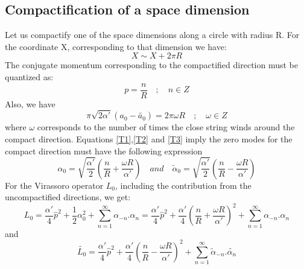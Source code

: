 \subsection{Compactification of a space dimension}
Let us compactify one of the space dimensions along a circle with radius R. For the coordinate X, corresponding to that dimension we have: 
\begin{equation}
	X\sim X + 2\pi R
\end{equation}
The conjugate momentum corresponding to the compactified direction must be quantized as:
\begin{equation}
	p = \frac{n}{R}\quad;\quad n \in Z
	\label{T2}
\end{equation}
Also, we have
\begin{equation}
	\pi\sqrt{2\alpha'}\left(a_0-\tilde{a_0}\right) = 2\pi\omega R\quad;\quad \omega\in Z
	\label{T3}
\end{equation}
 where $\omega$ corresponds to the number of times the close string winds around the compact direction. 
Equations \eqref{T1},\eqref{T2} and \eqref{T3} imply the zero modes for the compact direction must have the following expression
\begin{equation}
	\alpha_0 = \sqrt{\frac{\alpha'}{2}}\left(\frac{n}{R}+\frac{\omega R}{\alpha'}\right)\quad and\quad \tilde{\alpha}_0 = \sqrt{\frac{\alpha'}{2}}\left(\frac{n}{R}-\frac{\omega R}{\alpha'}\right) 
\end{equation}
For the Virassoro operator $L_0$, including the contribution from the uncompactified directions, we get:
\begin{equation}
	L_0 = \frac{\alpha'}{4}\hat{p}^2 + \frac{1}{2}\alpha_0^2 +\sum_{n=1}^\infty{\alpha_{-n}.\alpha_n} = \frac{\alpha'}{4}\hat{p}^2+\frac{\alpha'}{4}\left(\frac{n}{R}+\frac{\omega R}{\alpha'}\right)^2 + \sum_{n=1}^\infty{\alpha_{-n}.\alpha_n}
\end{equation}
and
\begin{equation}
 \tilde{L_0} = \frac{\alpha'}{4}\hat{p}^2 + \frac{\alpha'}{4}\left(\frac{n}{R}- \frac{\omega R}{\alpha'}\right)^2 + \sum_{n=1}^{\infty}{\tilde{\alpha}_{-n}.\tilde{\alpha_n}}
\end{equation}
